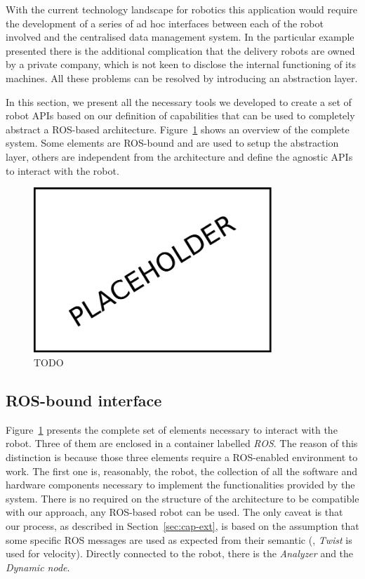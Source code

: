 With the current technology landscape for robotics this application would require the development of a series of ad hoc interfaces between each of the robot involved and the centralised data management system. In the particular example presented there is the additional complication that the delivery robots are owned by a private company, which is not keen to disclose the internal functioning of its machines.  All these problems can be resolved by introducing an abstraction layer. 

In this section, we present all the necessary tools we developed to create a set of robot APIs based on our definition of capabilities that can be used to completely abstract a ROS-based architecture. Figure~\ref{fig:robot-api} shows an overview of the complete system. Some elements are ROS-bound and are used to setup the abstraction layer, others are independent from the architecture and define the agnostic APIs to interact with the robot.

\begin{figure}[t]
    \centering
    \includegraphics[width=0.8\textwidth]{gfx/placeholder}
    \caption{TODO}\label{fig:robot-api}
\end{figure}

\subsection{ROS-bound interface}
Figure~\ref{fig:robot-api} presents the complete set of elements necessary to interact with the robot. Three of them are enclosed in a container labelled \textit{ROS}. The reason of this distinction is because those three elements require a ROS-enabled environment to work. The first one is, reasonably, the robot, the collection of all the software and hardware components necessary to implement the functionalities provided by the system. There is no required on the structure of the architecture to be compatible with our approach, any ROS-based robot can be used. The only caveat is that our process, as described in Section~\ref{sec:cap-ext}, is based on the assumption that some specific ROS messages are used as expected from their semantic (\eg, \textit{Twist} is used for velocity). Directly connected to the robot, there is the \textit{Analyzer} and the \textit{Dynamic node}.

